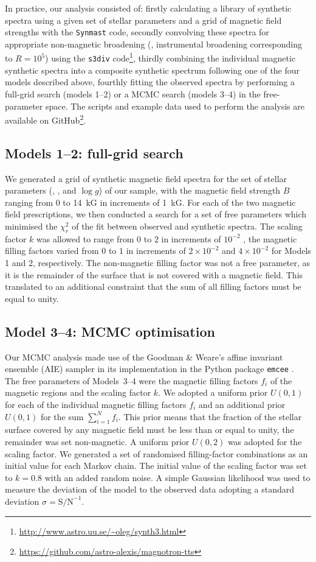 \documentclass{aa}
\begin{document}
In practice, our analysis consisted of: firstly calculating a library of synthetic spectra using a given set of stellar parameters and a grid of magnetic field strengths with the {\tt Synmast} code, secondly convolving these spectra for appropriate non-magnetic broadening ({\vsini}, instrumental broadening corresponding to $R=10^5$) using the {\tt s3div} code\footnote{\url{http://www.astro.uu.se/~oleg/synth3.html}}, thirdly combining the individual magnetic synthetic spectra into a composite synthetic spectrum following one of the four models described above, fourthly fitting the observed spectra by performing a full-grid search (models 1--2) or a MCMC search (models 3--4) in the free-parameter space. The scripts and example data used to perform the analysis are available on GitHub\footnote{\url{https://github.com/astro-alexis/magnotron-tts}}.

\subsection{Models 1--2: full-grid search}
\label{subsection:fullgrid}
We generated a grid of synthetic magnetic field spectra for the set of stellar parameters ({\teff}, {\vsini}, and $\log g$) of our sample, with the magnetic field strength $B$ ranging from 0 to 14~kG in increments of 1~kG.  For each of the two magnetic field prescriptions, we then conducted a search for a set of free parameters which minimised the $\chi_r^2$ of the fit between observed and synthetic spectra. The scaling factor $k$ was allowed to range from $0$ to $2$ in increments of $10^{-2}$ , the magnetic filling factors varied from $0$ to $1$ in increments of $2 \times 10^{-2}$ and $4 \times 10^{-2}$ for Models 1 and 2, respectively. The non-magnetic filling factor was not a free parameter, as it is the remainder of the surface that is not covered with a magnetic field. This translated to an additional constraint that the sum of all filling factors must be equal to unity. 

\subsection{Model 3--4: MCMC optimisation}
\label{subsection:mcmc}
Our MCMC analysis made use of the Goodman \& Weare's affine invariant ensemble (AIE) sampler \citep{2010CAMCS...5...65G} in its implementation in the Python package {\tt emcee} \citep{2013PASP..125..306F}. The free parameters of Models~3--4 were the magnetic filling factors $f_i$ of the magnetic regions and the scaling factor $k$. We adopted a uniform prior $U(0,1)$ for each of the individual magnetic filling factors $f_i$ and an additional prior $U(0,1)$ for the sum $\sum_{i=1}^{N} f_i$. This prior means that the fraction of the stellar surface covered by any magnetic field must be less than or equal to unity, the remainder was set non-magnetic. 
A uniform prior $U(0,2)$ was adopted for the scaling factor. We generated a set of randomised filling-factor combinations as an initial value for each Markov chain. The initial value of the scaling factor was set to $k = 0.8$ with an added random noise. A simple Gaussian likelihood was used to measure the deviation of the model to the observed data adopting a standard deviation $\sigma = \text{S/N}^{-1}$.
\end{document}

